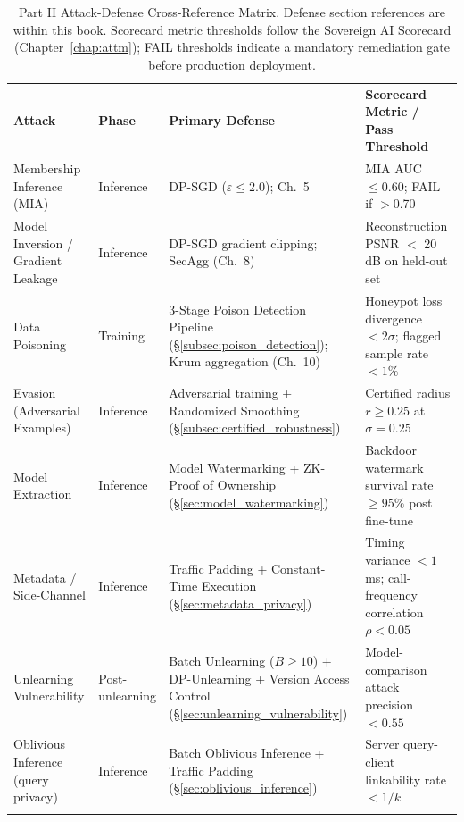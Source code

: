 \begin{table}[ht]
\centering
\caption{Part II Attack-Defense Cross-Reference Matrix. Defense section references are within this book. Scorecard metric thresholds follow the Sovereign AI Scorecard (Chapter~\ref{chap:attm}); FAIL thresholds indicate a mandatory remediation gate before production deployment.}
\label{tab:attack_defense_matrix}
\renewcommand{\arraystretch}{1.3}
\begin{tabular}{p{2.4cm} p{2.4cm} p{3.2cm} p{3.9cm}}
\hline\noalign{\smallskip}
\textbf{Attack} & \textbf{Phase} & \textbf{Primary Defense} & \textbf{Scorecard Metric / Pass Threshold} \\
\noalign{\smallskip}\svhline\noalign{\smallskip}
Membership Inference (MIA) & Inference & DP-SGD ($\varepsilon \leq 2.0$); Ch.~5 & MIA AUC $\leq 0.60$; FAIL if $>$0.70 \\[3pt]
Model Inversion / Gradient Leakage & Inference & DP-SGD gradient clipping; SecAgg (Ch.~8) & Reconstruction PSNR $<$ 20\,dB on held-out set \\[3pt]
Data Poisoning & Training & 3-Stage Poison Detection Pipeline (§\ref{subsec:poison_detection}); Krum aggregation (Ch.~10) & Honeypot loss divergence $< 2\sigma$; flagged sample rate $< 1\%$ \\[3pt]
Evasion (Adversarial Examples) & Inference & Adversarial training + Randomized Smoothing (§\ref{subsec:certified_robustness}) & Certified radius $r \geq 0.25$ at $\sigma = 0.25$ \\[3pt]
Model Extraction & Inference & Model Watermarking + ZK-Proof of Ownership (§\ref{sec:model_watermarking}) & Backdoor watermark survival rate $\geq 95\%$ post fine-tune \\[3pt]
Metadata / Side-Channel & Inference & Traffic Padding + Constant-Time Execution (§\ref{sec:metadata_privacy}) & Timing variance $< 1$\,ms; call-frequency correlation $\rho < 0.05$ \\[3pt]
Unlearning Vulnerability & Post-unlearning & Batch Unlearning ($B \geq 10$) + DP-Unlearning + Version Access Control (§\ref{sec:unlearning_vulnerability}) & Model-comparison attack precision $< 0.55$ \\[3pt]
Oblivious Inference (query privacy) & Inference & Batch Oblivious Inference + Traffic Padding (§\ref{sec:oblivious_inference}) & Server query-client linkability rate $< 1/k$ \\
\noalign{\smallskip}\hline\noalign{\smallskip}
\end{tabular}
\end{table}

